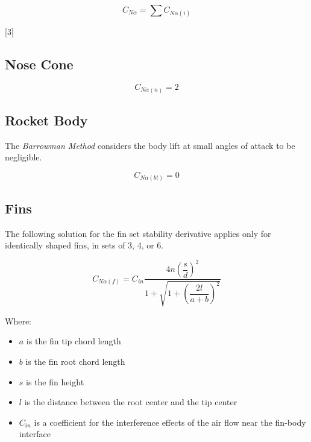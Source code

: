 \documentclass[]{article}
\providecommand{\tightlist}{%
  \setlength{\itemsep}{0pt}\setlength{\parskip}{0pt}}
\begin{document}
\begin{equation}
\label{total_stability_derivative}
C_{N \alpha} = \sum C_{N \alpha (i)}   
\end{equation}

{[}3{]}

\subsection{Nose Cone}\label{nose-cone}

\begin{equation}
\label{eq_sd_nosecone}
C_{N \alpha (n)} = 2
\end{equation}

\subsection{Rocket Body}\label{rocket-body}

The \emph{Barrowman Method} considers the body lift at small angles of
attack to be negligible.

\begin{equation}
\label{eq_sd_bodytube}
C_{N \alpha (bt)} = 0
\end{equation}

\subsection{Fins}\label{fins}

The following solution for the fin set stability derivative applies only
for identically shaped fins, in sets of 3, 4, or 6.

\begin{equation}
\label{eq_sd_fin_set}
C_{N \alpha(f)} = C_{in}\dfrac{4n \left( \dfrac{s}{d} \right)^2}{1 + \sqrt{1 + \left( \dfrac{2 l}{a + b} \right)^2}}
\end{equation}

Where:

\begin{itemize}
\tightlist
\item
  \(a\) is the fin tip chord length
\item
  \(b\) is the fin root chord length
\item
  \(s\) is the fin height
\item
  \(l\) is the distance between the root center and the tip center
\item
  \(C_{in}\) is a coefficient for the interference effects of the air
  flow near the fin-body interface
\end{itemize}
\end{document}

